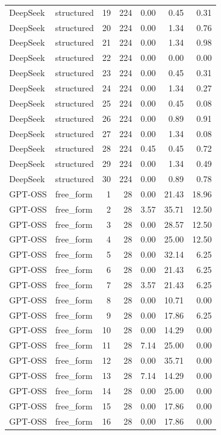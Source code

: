 \begin{longtable}{llrrrrr}
DeepSeek & structured & 19 & 224 & 0.00 & 0.45 & 0.31 \\
DeepSeek & structured & 20 & 224 & 0.00 & 1.34 & 0.76 \\
DeepSeek & structured & 21 & 224 & 0.00 & 1.34 & 0.98 \\
DeepSeek & structured & 22 & 224 & 0.00 & 0.00 & 0.00 \\
DeepSeek & structured & 23 & 224 & 0.00 & 0.45 & 0.31 \\
DeepSeek & structured & 24 & 224 & 0.00 & 1.34 & 0.27 \\
DeepSeek & structured & 25 & 224 & 0.00 & 0.45 & 0.08 \\
DeepSeek & structured & 26 & 224 & 0.00 & 0.89 & 0.91 \\
DeepSeek & structured & 27 & 224 & 0.00 & 1.34 & 0.08 \\
DeepSeek & structured & 28 & 224 & 0.45 & 0.45 & 0.72 \\
DeepSeek & structured & 29 & 224 & 0.00 & 1.34 & 0.49 \\
DeepSeek & structured & 30 & 224 & 0.00 & 0.89 & 0.78 \\
GPT-OSS & free\_form & 1 & 28 & 0.00 & 21.43 & 18.96 \\
GPT-OSS & free\_form & 2 & 28 & 3.57 & 35.71 & 12.50 \\
GPT-OSS & free\_form & 3 & 28 & 0.00 & 28.57 & 12.50 \\
GPT-OSS & free\_form & 4 & 28 & 0.00 & 25.00 & 12.50 \\
GPT-OSS & free\_form & 5 & 28 & 0.00 & 32.14 & 6.25 \\
GPT-OSS & free\_form & 6 & 28 & 0.00 & 21.43 & 6.25 \\
GPT-OSS & free\_form & 7 & 28 & 3.57 & 21.43 & 6.25 \\
GPT-OSS & free\_form & 8 & 28 & 0.00 & 10.71 & 0.00 \\
GPT-OSS & free\_form & 9 & 28 & 0.00 & 17.86 & 6.25 \\
GPT-OSS & free\_form & 10 & 28 & 0.00 & 14.29 & 0.00 \\
GPT-OSS & free\_form & 11 & 28 & 7.14 & 25.00 & 0.00 \\
GPT-OSS & free\_form & 12 & 28 & 0.00 & 35.71 & 0.00 \\
GPT-OSS & free\_form & 13 & 28 & 7.14 & 14.29 & 0.00 \\
GPT-OSS & free\_form & 14 & 28 & 0.00 & 25.00 & 0.00 \\
GPT-OSS & free\_form & 15 & 28 & 0.00 & 17.86 & 0.00 \\
GPT-OSS & free\_form & 16 & 28 & 0.00 & 17.86 & 0.00 \\

\end{longtable}
